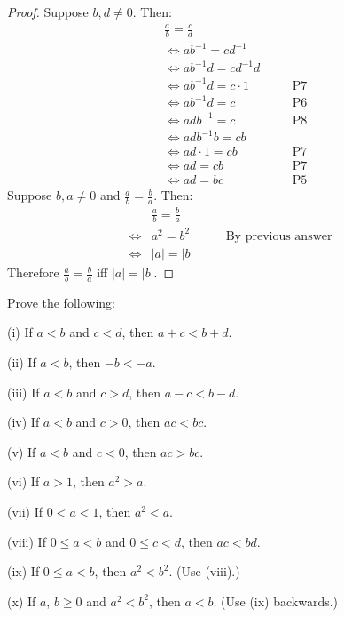 \begin{proof}
    Suppose $b, d \not = 0$. Then:
    \begin{align*}
        &\frac{a}{b} = \frac{c}{d} &&\quad \text{} \\
        &\iff ab^{-1} = cd^{-1} &&\quad \text{} \\
        &\iff ab^{-1}d = cd^{-1}d &&\quad \text{} \\
        &\iff ab^{-1}d = c \cdot 1&&\quad \text{P7} \\
        &\iff ab^{-1}d = c &&\quad \text{P6} \\
        &\iff adb^{-1} = c &&\quad \text{P8} \\
        &\iff adb^{-1}b = cb &&\quad \text{} \\
        &\iff ad \cdot 1 = cb &&\quad \text{P7} \\
        &\iff ad = cb &&\quad \text{P7} \\
        &\iff ad = bc &&\quad \text{P5} 
    \end{align*}
    Suppose $b, a \not = 0$ and  $\frac{a}{b} = \frac{b}{a}$. Then:
    \begin{align*}
        &\frac{a}{b} = \frac{b}{a} &&\quad \text{} \\
        \iff& a^2 = b^2 &&\quad \text{By previous answer} \\
        \iff& |a| = |b| &&\quad \text{} 
    \end{align*}
    Therefore $\frac{a}{b} = \frac{b}{a}$ iff $|a| = |b|$.
\end{proof}

\begin{tcolorbox}[title=Problem 5, breakable]
    Prove the following:

    (i) If $a < b$ and $c < d$, then $a + c < b + d$.

    (ii) If $a < b$, then $-b < -a$.

    (iii) If $a < b$ and $c > d$, then $a - c < b - d$.

    (iv) If $a < b$ and $c > 0$, then $ac < bc$.

    (v) If $a < b$ and $c < 0$, then $ac > bc$.

    (vi) If $a > 1$, then $a^2 > a$.

    (vii) If $0 < a < 1$, then $a^2 < a$.

    (viii) If $0 \le a < b$ and $0 \le c < d$, then $ac < bd$.

    (ix) If $0 \le a < b$, then $a^2 < b^2$. (Use (viii).)

    (x) If $a$, $b \ge 0$ and $a^2 < b^2$, then $a < b$. (Use (ix) backwards.)
\end{tcolorbox}

